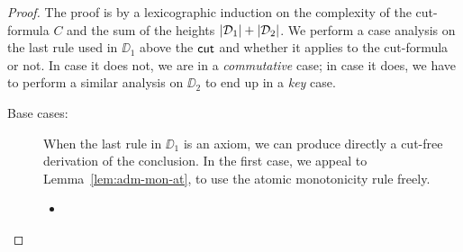 	\begin{proof}
		The proof is by a lexicographic induction on the complexity of the cut-formula $C$ and the sum of the heights $|\mathcal{D}_1|+|\mathcal{D}_2|$.
		We perform a case analysis on the last rule used in $\DD_1$ above the $\mathsf{cut}$ and whether it applies to the cut-formula or not.
		In case it does not, we are in a \emph{commutative} case; in case it does, we have to perform a similar analysis on $\DD_2$ to end up in a \emph{key} case.

                \begin{description}
                \item[Base cases:]\label{base-cases}
                When the last rule in $\DD_1$ is an axiom, 
                we can produce directly a cut-free derivation of the conclusion.
                In the first case, we appeal to Lemma~\ref{lem:adm-mon-at}, to use the atomic monotonicity rule freely.
        \begin{itemize}
        	                \item 
        	                \begin{smallequation*}
        	                \reducesto
        	            \end{smallequation*}
        	            

\end{itemize}
\end{description}
\end{proof}
